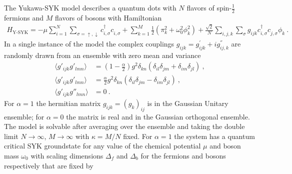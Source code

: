 \noindent
The Yukawa-SYK model describes a quantum dots with $N$ flavors of spin-$\frac{1}{2}$ fermions and $M$ flavors of bosons with Hamiltonian \cite{esterlis2019cooper}
\begin{align}
       H_{\text{Y-SYK}} = -\mu\sum_{i=1}^N\sum_{\sigma=\uparrow,\downarrow} c^\dagger_{i,\sigma} c^{\phantom{\dagger}}_{i, \sigma} + \sum_{k=1}^M \frac{1}{2}\left(\pi_k^2 + \omega_0^2\phi_k^2\right) + \frac{\sqrt{2}}{N}\sum_{i,j,k}\sum_{\sigma}g_{ijk} c^\dagger_{i,\sigma} c^{\phantom{\dagger}}_{j,\sigma} \phi^{\phantom{\dagger}}_k~.
    \label{eq:HYSYK}
\end{align}
In a single instance of the model the complex couplings $g_{ijk}=g^{'}_{ijk}+ig^{''}_{ij,k}$ are randomly drawn from an ensemble with zero mean and variance
\begin{align}
    \langle g'_{ijk}g'_{lmn}\rangle &= (1-\frac{\alpha}{2})g^2\delta_{kn}(\delta_{il}\delta_{jm}+\delta_{im}\delta_{jl})~,\nonumber\\
    \langle g'_{ijk}g'_{lmn}\rangle &= \frac{\alpha}{2}g^2\delta_{kn}(\delta_{il}\delta_{jm}-\delta_{im}\delta_{jl})~,\nonumber\\
    \langle g'_{ijk}g''_{lmn}\rangle &=0~.
\end{align}
For $\alpha=1$ the hermitian matrix $g_{ijk}=(g_k)_{ij}$ is in the Gaussian Unitary ensemble; for $\alpha=0$ the matrix is real and in the Gaussian orthogonal ensemble. The model is solvable after averaging over the ensemble and taking the double limit $N\rightarrow \infty$, $M\rightarrow\infty$ with $\kappa=M/N$ fixed.
For $\alpha=1$ the system has a quantum critical SYK groundstate for any value of the chemical potential $\mu$ and boson mass $\omega_0$ with scaling dimensions $\Delta_f$ and $\Delta_b$ for the fermions and bosons respectively that are fixed by 
